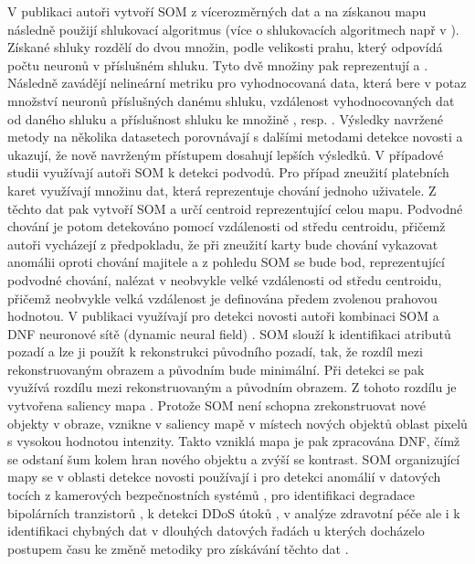 V publikaci \cite{som6} autoři vytvoří SOM z vícerozměrných dat a na získanou mapu následně použijí shlukovací algoritmus (více o shlukovacích algoritmech např v \cite{klastry}). Získané shluky rozdělí do dvou množin, podle velikosti prahu, který odpovídá počtu neuronů v příslušném shluku. Tyto dvě množiny pak reprezentují  a . Následně zavádějí nelineární metriku pro vyhodnocovaná data, která bere v potaz množství neuronů příslušných danému shluku, vzdálenost vyhodnocovaných dat od daného shluku a příslušnost shluku ke množině , resp. . Výsledky navržené metody na několika datasetech porovnávají s dalšími metodami detekce novosti a ukazují, že nově navrženým přístupem dosahují lepších výsledků. V případové studii \cite{som3} využívají autoři SOM k detekci podvodů. Pro případ zneužití platebních karet využívají množinu dat, která reprezentuje chování jednoho uživatele. Z těchto dat pak vytvoří SOM a určí centroid reprezentující celou mapu. Podvodné chování je potom detekováno pomocí vzdálenosti od středu centroidu, přičemž autoři vycházejí z předpokladu, že při zneužití karty bude chování vykazovat anomálii oproti chování majitele a z pohledu SOM se bude bod, reprezentující podvodné chování, nalézat v neobvykle velké vzdálenosti od středu centroidu, přičemž neobvykle velká vzdálenost je definována předem zvolenou prahovou hodnotou. V publikaci \cite{som1} využívají pro detekci novosti autoři kombinaci SOM a DNF neuronové sítě (dynamic neural field) \cite{dynamic_neural}. SOM slouží k identifikaci atributů pozadí a lze ji použít k rekonstrukci původního pozadí, tak, že rozdíl mezi rekonstruovaným obrazem a původním bude minimální. Při detekci se pak využívá rozdílu mezi rekonstruovaným a původním obrazem. Z tohoto rozdílu je vytvořena saliency mapa \cite{sal}. Protože SOM není schopna zrekonstruovat nové objekty v obraze, vznikne v saliency mapě v místech nových objektů oblast pixelů s vysokou hodnotou  intenzity. Takto vzniklá mapa je pak zpracována DNF, čímž se odstaní šum kolem hran nového objektu a zvýší se kontrast. SOM organizující mapy se v oblasti detekce novosti používají i pro detekci anomálií v datových tocích z kamerových bezpečnostních systémů \cite{som2}, pro identifikaci degradace bipolárních tranzistorů \cite{som4}, k detekci DDoS útoků \cite{som7}, v analýze zdravotní péče \cite{som8} ale i k identifikaci chybných dat v dlouhých datových řadách u kterých docházelo postupem času ke změně metodiky pro získávání těchto dat \cite{som5}.

